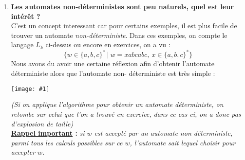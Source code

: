 \documentclass{article}
\newcommand{\rouge}[1]{\textcolor{darkred}{#1}}
\newcommand{\term}[1]{\textit{\textcolor{maintitle}{#1}}}
\newcommand{\imgR}[2]{\begin{center}\texttt{[image: \#1]}\end{center}}
\begin{document}
\begin{sffamily}
\begin{enumerate}
\textbf{\underline{Commentaires sur ce théorème} :}
\begin{itemize}
\item les automates non déterministes ne sont pas plus puissants que les automates déterministes,
\item il existe un algorithme de construction de $M'$ à partir de $M$,
\item la taille de $M'$, si $M$ a $n$ états ($|Q|=n$) alors $M'$ a $2^n$ états ($|\mathcal{P}(Q)|=2^n$), \rouge{taille 
exponentielle}, mais l'exemple précédant montre que si l'on se limite aux états accessibles de l'état initial, la 
taille reste convenable.
\item le théorème suivant est négatif : soit $L_k$ défini comme suit :
\begin{center}\begin{eqnarray*}
L_k & = & \{x1y | x \in \Sigma^*_{bool}, y \in \Sigma^{k-1}_bool\}\text{, }k\geq 1\text{ fixé} \\
    & = & \{w \in \Sigma^*_{bool}\ |\ \text{$w$ possède un $1$ en position $k$ en partant de la fin}\}
\end{eqnarray*}
\end{center}
$L_k$ est accepté par l'automate non-déterministe suivant : \\
\imgR{img22.png}{200}
Alors, l'automate déterministe $M'_k$ construit par l'algorithme précédent a au moins $2^k$ états parmis les états 
accessibles de l'état initial. \\
\end{itemize}

\item \textbf{Les automates non-déterministes sont peu naturels, quel est leur intérêt ?}\\
C'est un concept interessant car pour certains exemples, il est plus facile de trouver un automate 
\term{non-déterministe}. Dans ces exemples, on compte le langage $L_k$ ci-dessus ou encore en exercices, on a vu :
$$ \{ w \in \{a,b,c\}^*\ |\ w = xabcabc,\ x\in \{a,b,c\}^*\}$$
Nous avons du avoir une certaine réflexion afin d'obtenir l'automate déterministe alors que l'automate non-
déterministe est très simple : 
\imgR{img23.png}{200}

\textit{(Si on applique l'algorithme pour obtenir un automate déterministe, on retombe sur celui que l'on a trouvé
en exercice, dans ce cas-ci, on a donc pas d'explosion de taille)} \\

\noindent \textbf{\underline{Rappel important} : }\textit{ si $w$ est accepté par un automate non-déterministe, parmi
tous les calculs possibles sur ce $w$, l'automate sait lequel choisir pour accepter $w$.} \\


\end{enumerate}
\end{sffamily}
\end{document}

